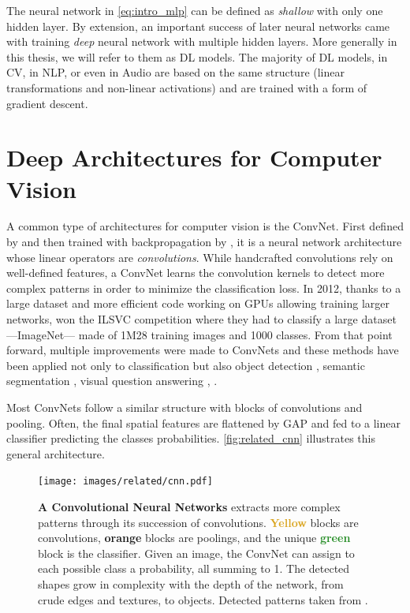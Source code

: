 The neural network in \autoref{eq:intro_mlp} can be defined as \textit{shallow} with only one hidden
layer. By extension, an important success of later neural networks came with training \textit{deep}
neural network with multiple hidden layers. More generally in this thesis, we will refer to them as
\acf{DL} models. The majority of \ac{DL} models, in \acf{CV}, in \acf{NLP}, or even in Audio are
based on the same structure (linear transformations and non-linear activations) and are trained with
a form of gradient descent.

\section{Deep Architectures for Computer Vision}
\label{sec:related_cv}

A common type of architectures for computer vision is the \acf{ConvNet}. First defined by
\citet{fukushima1980neocognitron} and then trained with backpropagation by \citet{lecun1999lenet}, it
is a neural network architecture whose linear operators are \textit{convolutions}. While
handcrafted convolutions \citep{lowe1999sift} rely on well-defined features, a \ac{ConvNet} learns
the convolution kernels to detect more complex patterns in order to minimize the classification
loss. In 2012, thanks to a large dataset and more efficient code working on \acp{GPU} allowing
training larger networks, \citet{krizhevsky2012alexnet} won the ILSVC competition
\citep{russakovsky2015imagenet_ilsvrc} where they had to classify a large dataset ---ImageNet---
made of 1M28 training images and 1000 classes. From that point forward, multiple improvements were
made to \acp{ConvNet} \citep{ioffe2015batchnorm,he2016resnet} and these methods have been applied not
only to classification but also object detection \citep{ren20fasterrcnn}, semantic segmentation
\citep{chen2018deeplab}, visual question answering \citep{antol2015vqa}, \etc.

Most \acp{ConvNet} follow a similar structure with blocks of convolutions and pooling. Often, the
final spatial features are flattened by \ac{GAP} and fed to a linear classifier
predicting the classes probabilities. \autoref{fig:related_cnn} illustrates this general architecture.

\begin{figure}[tb]
      \begin{center}
            \texttt{[image: images/related/cnn.pdf]}
      \end{center}
      \caption{\textbf{A Convolutional Neural Networks} extracts more complex patterns through its
            succession of convolutions. \textcolor{Goldenrod}{\textbf{Yellow}} blocks are
            convolutions, \textcolor{BurntOrange}{\textbf{orange}} blocks are poolings, and the
            unique \textcolor{ForestGreen}{\textbf{green}} block is the classifier. Given an image,
            the \ac{ConvNet} can assign to each possible class a probability, all summing to 1. The
            detected shapes grow in complexity with the depth of the network, from crude edges and
            textures, to objects. Detected patterns taken from \citet{olah2017feature}.}
      \label{fig:related_cnn}
\end{figure}


